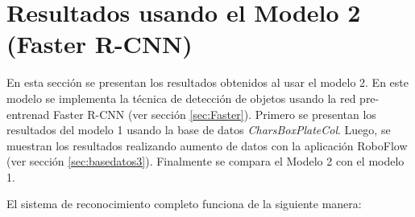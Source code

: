 \chapter{Resultados usando el Modelo 2\\
(Faster R-CNN)}

En esta sección se presentan los resultados obtenidos al usar el modelo 2. En este modelo se implementa la técnica de detección de objetos usando la red pre-entrenad Faster R-CNN (ver sección \ref{sec:Faster}).  Primero  se  presentan  los  resultados  del  modelo  1  usando  la  base  de datos \textit{CharsBoxPlateCol}. Luego, se muestran los resultados realizando aumento de datos con la aplicación RoboFlow (ver sección \ref{sec:basedatos3}). Finalmente se compara el Modelo 2 con el modelo 1.

El sistema de reconocimiento completo funciona de la siguiente manera: 
